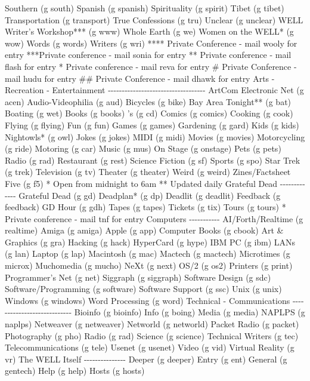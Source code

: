 \documentclass{article}
\begin{document}
Southern        (g south)   Spanish   (g spanish) Spirituality      (g spirit)  Tibet    (g tibet) Transportation     (g transport) True Confessions (g tru) Unclear        (g unclear)  WELL Writer's Workshop*** (g www) Whole Earth      (g we)    Women on the WELL* (g wow) Words         (g words)   Writers   (g wri)   **** Private Conference {-} mail wooly for entry ***Private conference {-} mail sonia for entry ** Private conference {-} mail flash for entry * Private conference {-} mail reva for entry \# Private Conference {-} mail hudu for entry \#\# Private Conference {-} mail dhawk for entry             Arts {-} Recreation {-} Entertainment         {-}{-}{-}{-}{-}{-}{-}{-}{-}{-}{-}{-}{-}{-}{-}{-}{-}{-}{-}{-}{-}{-}{-}{-}{-}{-}{-}{-}{-}{-}{-}{-}{-}{-}{-}   ArtCom Electronic Net (g acen) Audio{-}Videophilia   (g aud) Bicycles        (g bike)   Bay Area Tonight** (g bat) Boating        (g wet)    Books    (g books) 's          (g cd)    Comics    (g comics) Cooking        (g cook)   Flying    (g flying) Fun          (g fun)    Games    (g games) Gardening       (g gard)   Kids     (g kids) Nightowls*       (g owl)    Jokes    (g jokes) MIDI          (g midi)   Movies    (g movies) Motorcycling      (g ride)   Motoring   (g car) Music         (g mus)    On Stage   (g onstage) Pets          (g pets)   Radio    (g rad) Restaurant       (g rest)   Science Fiction (g sf) Sports         (g spo)    Star Trek  (g trek) Television       (g tv)    Theater   (g theater) Weird         (g weird)   Zines/Factsheet Five (g f5)   * Open from midnight to 6am ** Updated daily                   Grateful Dead                {-}{-}{-}{-}{-}{-}{-}{-}{-}{-}{-}{-}{-}   Grateful Dead     (g gd)    Deadplan*  (g dp) Deadlit        (g deadlit)  Feedback   (g feedback) GD Hour        (g gdh)    Tapes    (g tapes) Tickets        (g tix)    Tours    (g tours)   * Private conference {-} mail tnf for entry                  Computers               {-}{-}{-}{-}{-}{-}{-}{-}{-}{-}{-}   AI/Forth/Realtime   (g realtime) Amiga    (g amiga) Apple         (g app)    Computer Books (g cbook) Art \& Graphics     (g gra)    Hacking   (g hack) HyperCard       (g hype)   IBM PC    (g ibm) LANs          (g lan)    Laptop    (g lap) Macintosh       (g mac)    Mactech   (g mactech) Microtimes       (g microx)  Muchomedia  (g mucho) NeXt          (g next)   OS/2     (g os2) Printers        (g print)   Programmer's Net (g net) Siggraph        (g siggraph) Software Design (g sdc) Software/Programming  (g software) Software Support    (g ssc) Unix          (g unix)   Windows   (g windows) Word Processing    (g word)              Technical {-} Communications          {-}{-}{-}{-}{-}{-}{-}{-}{-}{-}{-}{-}{-}{-}{-}{-}{-}{-}{-}{-}{-}{-}{-}{-}{-}{-}{-}{-}   Bioinfo        (g bioinfo)  Info     (g boing) Media         (g media)   NAPLPS    (g naplps) Netweaver       (g netweaver) Networld   (g networld) Packet Radio      (g packet)  Photography (g pho) Radio         (g rad)    Science   (g science) Technical Writers   (g tec)    Telecommunications (g tele) Usenet         (g usenet)  Video    (g vid) Virtual Reality    (g vr)                 The WELL Itself              {-}{-}{-}{-}{-}{-}{-}{-}{-}{-}{-}{-}{-}{-}{-}   Deeper         (g deeper)  Entry    (g ent) General        (g gentech)  Help     (g help) Hosts         (g hosts)   
\end{document}
